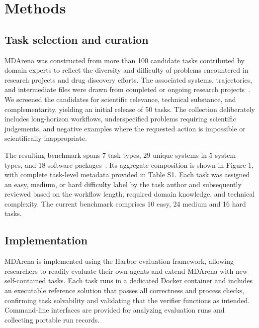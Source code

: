 \documentclass[twoside,twocolumn,9pt]{article}
\begin{document}
\section{Methods}

\subsection{Task selection and curation}

MDArena was constructed from more than 100 candidate tasks contributed by domain experts to reflect the diversity and difficulty of problems encountered in research projects and drug discovery efforts. The associated systems, trajectories, and intermediate files were drawn from completed or ongoing research projects~\cite{huang2013charmm36,jo2008charmm,kaminski2001evaluation,lindorff2010improved,hsu2023alchemical,dore2011structure,gerstenberger2020discovery,vojtvechovsky1999crystal,joshi2026structural,yin2015crystal,suno2018crystal,liu2012structural,hsu2022identifying,christopher2015fragment,chien2010structure,parker2024structural,hsu2024replica,borodovsky2020small}. We screened the candidates for scientific relevance, technical substance, and complementarity, yielding an initial release of 50 tasks. The collection deliberately includes long-horizon workflows, underspecified problems requiring scientific judgements, and negative examples where the requested action is impossible or scientifically inappropriate. 

The resulting benchmark spans 7 task types, 29 unique systems in 5 system types, and 18 software packages~\cite{abraham2015gromacs,eastman2024openmm,beckstein2016mdanalysis,case2023ambertools,sousa2012acpype,boothroyd2023development,landrum2013rdkit,o2011open,openfe,wu2024alchemlyb,tribello2014plumed,neese2020orca,merz2018testing,merz2022physical_validation}. Its aggregate composition is shown in Figure 1, with complete task-level metadata provided in Table S1. Each task was assigned an easy, medium, or hard difficulty label by the task author and subsequently reviewed based on the workflow length, required domain knowledge, and technical complexity. The current benchmark comprises 10 easy, 24 medium and 16 hard tasks. 

\subsection{Implementation}

MDArena is implemented using the Harbor\cite{Harbor_Framework} evaluation framework, allowing researchers to readily evaluate their own agents and extend MDArena with new self-contained tasks. Each task runs in a dedicated Docker container\cite{moreau2023containers} and includes an executable reference solution that passes all correctness and process checks, confirming task solvability and validating that the verifier functions as intended. Command-line interfaces are provided for analyzing evaluation runs and collecting portable run records. 
\end{document}
